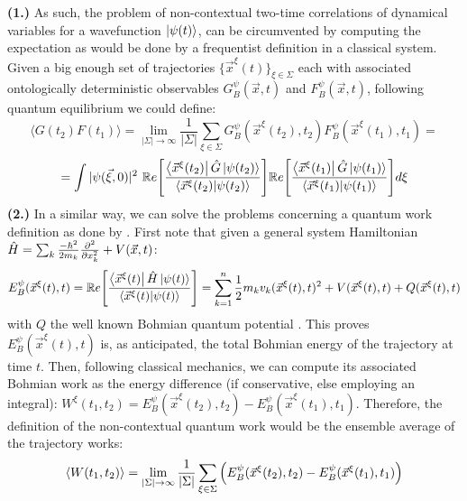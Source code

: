 \documentclass[11pt, a4paper]{article} %
\begin{document}
{\bf (1.)} As such, the problem of non-contextual two-time correlations of dynamical variables for a wavefunction $\ket{\psi(t)}$, can be circumvented by computing the expectation as would be done by a frequentist definition in a classical system. Given a big enough set of trajectories $\{\vec{x}^\xi(t)\}_{\xi\in \Sigma}$ each with associated ontologically deterministic observables $G_B^\psi(\vec{x},t)$ and $F_B^\psi(\vec{x},t)$, following quantum equilibrium \cite{Absolute} we could define:
\begin{equation}
\langle G(t_2)F(t_1)\rangle = \lim_{|\Sigma|\rightarrow \infty}\frac{1}{|\Sigma|} \sum_{\xi\in\Sigma} G_B^\psi(\vec{x}^\xi(t_2),t_2)F_B^\psi(\vec{x}^\xi(t_1),t_1) =
\end{equation}
$$
=  \int |\psi(\vec{\xi},0)|^2\ \mathbb{R}e\qty[ \frac{\bra{\vec{x}^\xi(t_2)}\hat{G}\ket{\psi(t_2)}}{\bra{\vec{x}^\xi(t_2)}\ket{\psi(t_2)}} ] \mathbb{R}e\qty[ \frac{\bra{\vec{x}^\xi(t_1)}\hat{G}\ket{\psi(t_1)}}{\bra{\vec{x}^\xi(t_1)}\ket{\psi(t_1)}} ]d\xi
$$
{\bf (2.) } In a similar way, we can solve the problems concerning a quantum work definition as done by \cite{work1, work2}. First note that given a general system Hamiltonian $\hat{H}=\sum_k \frac{-\hbar^2}{2m_k}\pdv[2]{}{x_k}+V(\vec{x},t)$:
\begin{equation}
E^\psi_B(\vec{x}^\xi(t),t) = \mathbb{R}e\qty[ \frac{\bra{\vec{x}^\xi(t)}\hat{H}\ket{\psi(t)}}{\bra{\vec{x}^\xi(t)}\ket{\psi(t)}} ] = \sum_{k=1}^n\frac{1}{2}m_kv_k(\vec{x}^\xi(t),t)^2+V(\vec{x}^\xi(t),t)+Q(\vec{x}^\xi(t),t)
\end{equation}
with $Q$ the well known Bohmian quantum potential \cite{Holland, Durr, JordiXavier}. This proves $E^\psi_B(\vec{x}^\xi(t),t)$ is, as anticipated, the total Bohmian energy of the trajectory at time $t$. Then, following classical mechanics, we can compute its associated Bohmian work as the energy difference (if conservative, else employing an integral): $W^\xi(t_1,t_2)= E^\psi_B(\vec{x}^\xi(t_2),t_2)-E^\psi_B(\vec{x}^\xi(t_1),t_1)$. Therefore, the definition of the non-contextual quantum work would be the ensemble average of the trajectory works:
\begin{equation}
\langle W(t_1,t_2)\rangle = \lim_{|\Sigma|\rightarrow \infty}\frac{1}{|\Sigma|} \sum_{\xi\in\Sigma} \qty(E^\psi_B(\vec{x}^\xi(t_2),t_2)-E^\psi_B(\vec{x}^\xi(t_1),t_1))
\end{equation}
\end{document}
